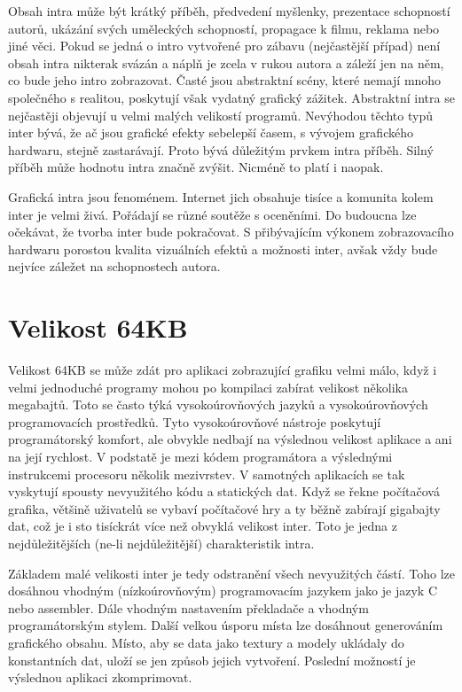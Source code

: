 Obsah intra může být krátký příběh, předvedení myšlenky, prezentace schopností autorů, ukázání svých uměleckých schopností, propagace k filmu, reklama nebo jiné věci.
Pokud se jedná o intro vytvořené pro zábavu (nejčastější případ) není obsah intra nikterak svázán a náplň je zcela v rukou autora a záleží jen na něm, co bude jeho intro zobrazovat.
Časté jsou abstraktní scény, které nemají mnoho společného s realitou, poskytují však vydatný grafický zážitek.
Abstraktní intra se nejčastěji objevují u velmi malých velikostí programů.
Nevýhodou těchto typů inter bývá, že ač jsou grafické efekty sebelepší časem, s vývojem grafického hardwaru, stejně zastarávají.
Proto bývá důležitým prvkem intra příběh.
Silný příběh může hodnotu intra značně zvýšit. Nicméně to platí i naopak.

Grafická intra jsou fenoménem.
Internet jich obsahuje tisíce a komunita kolem inter je velmi živá.
Pořádají se různé soutěže s oceněními.
Do budoucna lze očekávat, že tvorba inter bude pokračovat.
S přibývajícím výkonem zobrazovacího hardwaru porostou kvalita vizuálních efektů a možnosti inter, avšak vždy bude nejvíce záležet na schopnostech autora.

\section{Velikost 64KB}
Velikost 64KB se může zdát pro aplikaci zobrazující grafiku velmi málo, když i velmi jednoduché programy mohou po kompilaci zabírat velikost několika megabajtů.
Toto se často týká vysokoúrovňových jazyků a vysokoúrovňových programovacích prostředků.
Tyto vysokoúrovňové nástroje poskytují programátorský komfort, ale obvykle nedbají na vý\-sled\-nou velikost aplikace a ani na její rychlost.
V podstatě je mezi kódem programátora a výslednými instrukcemi procesoru několik mezivrstev.
V samotných aplikacích se tak vyskytují spousty nevyužitého kódu a statických dat.
Když se řekne počítačová grafika, většině uživatelů se vybaví počítačové hry a ty běžně zabírají gigabajty dat, což je i sto tisíckrát více než obvyklá velikost inter.
Toto je jedna z nejdůležitějších (ne-li nejdůležitější) charakteristik intra.

Základem malé velikosti inter je tedy odstranění všech nevyužitých částí.
Toho lze dosáhnou vhodným (nízkoúrovňovým) programovacím jazykem jako je jazyk C nebo assembler.
Dále vhodným nastavením překladače a vhodným programátorským stylem.
Další velkou úsporu místa lze dosáhnout generováním grafického obsahu.
Místo, aby se data jako textury a modely ukládaly do konstantních dat, uloží se jen způsob jejich vytvoření.
Poslední možností je výslednou aplikaci zkomprimovat. 

